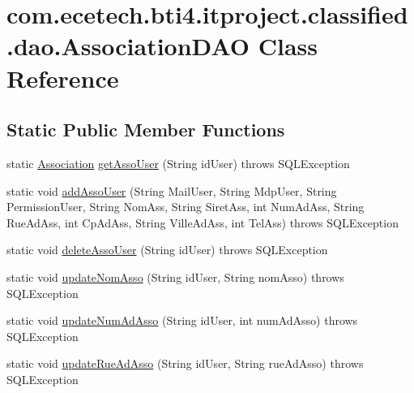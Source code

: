 \hypertarget{classcom_1_1ecetech_1_1bti4_1_1itproject_1_1classified_1_1dao_1_1_association_d_a_o}{}\section{com.\+ecetech.\+bti4.\+itproject.\+classified.\+dao.\+Association\+D\+AO Class Reference}
\label{classcom_1_1ecetech_1_1bti4_1_1itproject_1_1classified_1_1dao_1_1_association_d_a_o}
\subsection*{Static Public Member Functions}
\begin{DoxyCompactItemize}
\item 
static \hyperlink{classcom_1_1ecetech_1_1bti4_1_1itproject_1_1classified_1_1beans_1_1_association}{Association} \hyperlink{classcom_1_1ecetech_1_1bti4_1_1itproject_1_1classified_1_1dao_1_1_association_d_a_o_aa162d952d94f0879a9610d9dd94b9326}{get\+Asso\+User} (String id\+User)  throws S\+Q\+L\+Exception 
\item 
static void \hyperlink{classcom_1_1ecetech_1_1bti4_1_1itproject_1_1classified_1_1dao_1_1_association_d_a_o_a36927ba0db8b58b9a413d9b41a29d585}{add\+Asso\+User} (String Mail\+User, String Mdp\+User, String Permission\+User, String Nom\+Ass, String Siret\+Ass, int Num\+Ad\+Ass, String Rue\+Ad\+Ass, int Cp\+Ad\+Ass, String Ville\+Ad\+Ass, int Tel\+Ass)  throws S\+Q\+L\+Exception 
\item 
static void \hyperlink{classcom_1_1ecetech_1_1bti4_1_1itproject_1_1classified_1_1dao_1_1_association_d_a_o_a38507a0fc15499fabbcd9ce9f74da511}{delete\+Asso\+User} (String id\+User)  throws S\+Q\+L\+Exception 
\item 
static void \hyperlink{classcom_1_1ecetech_1_1bti4_1_1itproject_1_1classified_1_1dao_1_1_association_d_a_o_a27417f3e5267a2d65e0849faf7652a52}{update\+Nom\+Asso} (String id\+User, String nom\+Asso)  throws S\+Q\+L\+Exception 
\item 
static void \hyperlink{classcom_1_1ecetech_1_1bti4_1_1itproject_1_1classified_1_1dao_1_1_association_d_a_o_a1821ad5594c12b3ac543a7cc64b8f815}{update\+Num\+Ad\+Asso} (String id\+User, int num\+Ad\+Asso)  throws S\+Q\+L\+Exception 
\item 
static void \hyperlink{classcom_1_1ecetech_1_1bti4_1_1itproject_1_1classified_1_1dao_1_1_association_d_a_o_adf30b71b8932d9cd78eb649826de61d5}{update\+Rue\+Ad\+Asso} (String id\+User, String rue\+Ad\+Asso)  throws S\+Q\+L\+Exception 

\end{DoxyCompactItemize}

